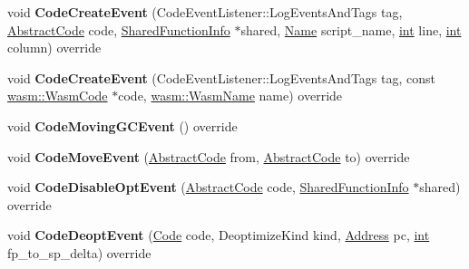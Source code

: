 \begin{DoxyCompactItemize}
\mbox{\label{classv8_1_1internal_1_1ProfilerListener_a02e669924d15491365a616a2b649f371}} 
void {\bfseries Code\+Create\+Event} (Code\+Event\+Listener\+::\+Log\+Events\+And\+Tags tag, \mbox{\hyperlink{classv8_1_1internal_1_1AbstractCode}{Abstract\+Code}} code, \mbox{\hyperlink{classv8_1_1internal_1_1SharedFunctionInfo}{Shared\+Function\+Info}} $\ast$shared, \mbox{\hyperlink{classv8_1_1internal_1_1Name}{Name}} script\+\_\+name, \mbox{\hyperlink{classint}{int}} line, \mbox{\hyperlink{classint}{int}} column) override
\item 
\mbox{\label{classv8_1_1internal_1_1ProfilerListener_a9eda1140221812bb7db39bc25c99c47f}} 
void {\bfseries Code\+Create\+Event} (Code\+Event\+Listener\+::\+Log\+Events\+And\+Tags tag, const \mbox{\hyperlink{classv8_1_1internal_1_1wasm_1_1WasmCode}{wasm\+::\+Wasm\+Code}} $\ast$code, \mbox{\hyperlink{classv8_1_1internal_1_1Vector}{wasm\+::\+Wasm\+Name}} name) override
\item 
\mbox{\label{classv8_1_1internal_1_1ProfilerListener_a4ca0eaaafeb5271c053cd5a6b7220150}} 
void {\bfseries Code\+Moving\+G\+C\+Event} () override
\item 
\mbox{\label{classv8_1_1internal_1_1ProfilerListener_ac885796988030e4a546bea218fd25cf8}} 
void {\bfseries Code\+Move\+Event} (\mbox{\hyperlink{classv8_1_1internal_1_1AbstractCode}{Abstract\+Code}} from, \mbox{\hyperlink{classv8_1_1internal_1_1AbstractCode}{Abstract\+Code}} to) override
\item 
\mbox{\label{classv8_1_1internal_1_1ProfilerListener_a8dd6c9de402e3bb457dbf474b886e5c8}} 
void {\bfseries Code\+Disable\+Opt\+Event} (\mbox{\hyperlink{classv8_1_1internal_1_1AbstractCode}{Abstract\+Code}} code, \mbox{\hyperlink{classv8_1_1internal_1_1SharedFunctionInfo}{Shared\+Function\+Info}} $\ast$shared) override
\item 
\mbox{\label{classv8_1_1internal_1_1ProfilerListener_a6421fa93e4dc5d0ed30fc76d4f43610c}} 
void {\bfseries Code\+Deopt\+Event} (\mbox{\hyperlink{classv8_1_1internal_1_1Code}{Code}} code, Deoptimize\+Kind kind, \mbox{\hyperlink{classuintptr__t}{Address}} pc, \mbox{\hyperlink{classint}{int}} fp\+\_\+to\+\_\+sp\+\_\+delta) override

\end{DoxyCompactItemize}
